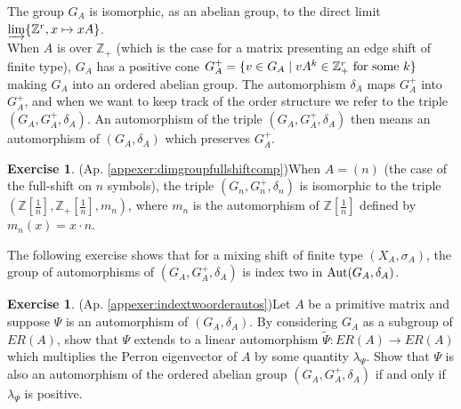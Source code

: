 \documentclass{amsart}
\theoremstyle{definition}
\newtheorem{exer}[equation]{Exercise}
\theoremstyle{definition}
\newcommand{\apr}{(Ap. \ref}
\newcommand{\aut}{\textnormal{Aut}}
\numberwithin{equation}{subsection}
\begin{document}
The group $G_{A}$ is isomorphic, as an abelian group, to the direct limit
 $\varinjlim \{\mathbb{Z}^{r}, x \mapsto xA\}$.\\


When $A$ is over $\mathbb{Z}_{+}$ (which is the case for a matrix presenting an edge shift of finite type), $G_{A}$ has a positive cone $G_{A}^{+} = \{v \in G_{A} \mid vA^{k} \in \mathbb{Z}^{r}_{+} \textnormal{ for some } k\}$ making $G_{A}$ into an ordered abelian group. The automorphism $\delta_{A}$ maps $G_{A}^{+}$ into $G_{A}^{+}$, and when we want to keep track of the order structure we refer to the triple $(G_{A},G_{A}^{+},\delta_{A})$. An automorphism of the triple $(G_{A},G_{A}^{+},\delta_{A})$ then means an automorphism of $(G_{A},\delta_{A})$ which preserves $G_{A}^{+}$.\\

\begin{exer}\apr{appexer:dimgroupfullshiftcomp})\label{exer:dimgroupfullshiftcomp}
When $A = (n)$ (the case of the full-shift on $n$ symbols), the triple $(G_{n},G_{n}^{+},\delta_{n})$ is isomorphic to the triple $(\mathbb{Z}[\frac{1}{n}],\mathbb{Z}_{+}[\frac{1}{n}],m_{n})$, where $m_{n}$ is the automorphism of $\mathbb{Z}[\frac{1}{n}]$ defined by $m_{n}(x) = x \cdot n$.
\end{exer}

The following exercise shows that for a mixing shift of finite type $(X_{A},\sigma_{A})$, the group of automorphisms of $(G_{A},G_{A}^{+},\delta_{A})$ is index two in $\aut(G_{A},\delta_{A})$.

\begin{exer}\apr{appexer:indextwoorderautos})\label{exer:indextwoorderautos}
Let $A$ be a primitive matrix and suppose $\Psi$ is an automorphism of $(G_{A},\delta_{A})$. By considering $G_{A}$ as a subgroup of $ER(A)$, show that $\Psi$ extends to a linear automorphism $\tilde{\Psi} \colon ER(A) \to ER(A)$ which multiplies the Perron eigenvector of $A$ by some quantity $\lambda_{\Psi}$. Show that $\Psi$ is also an automorphism of the ordered abelian group $(G_{A},G_{A}^{+},\delta_{A})$ if and only if $\lambda_{\Psi}$ is positive.
\end{exer}
\end{document}
